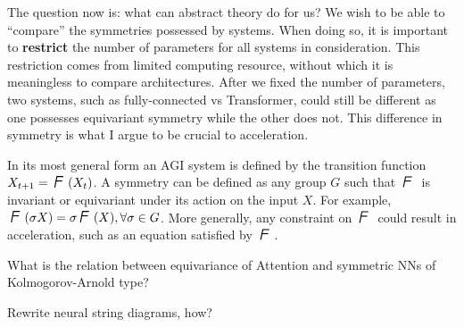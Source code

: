 
The question now is:  what can abstract theory do for us?  We wish to be able to ``compare'' the symmetries possessed by systems.  When doing so, it is important to \textbf{restrict} the number of parameters for all systems in consideration.  This restriction comes from limited computing resource, without which it is meaningless to compare architectures.  After we fixed the number of parameters, two systems, such as fully-connected vs Transformer, could still be different as one possesses equivariant symmetry while the other does not.  This difference in symmetry is what I argue to be crucial to acceleration.

In its most general form an AGI system is defined by the transition function $X_{t+1} = \squareF(X_t)$.  A symmetry can be defined as any group $G$ such that $\squareF$ is invariant or equivariant under its action on the input $X$.  For example, $\squareF(\sigma X) = \sigma \squareF(X), \forall \sigma \in G$.  More generally, any constraint on $\squareF$ could result in acceleration, such as an equation satisfied by $\squareF$.

What is the relation between equivariance of Attention and symmetric NNs of Kolmogorov-Arnold type?

Rewrite neural string diagrams, how?
